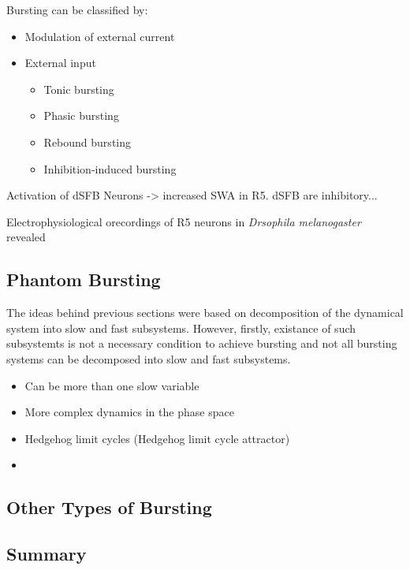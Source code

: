 \documentclass[../main.tex]{subfiles}
\begin{document}
\color{red}
Bursting can be classified by:
\begin{itemize}
    \item Modulation of external current
\end{itemize}    

\begin{itemize}
    \item External input
    \begin{itemize}
        \item Tonic bursting
        \item Phasic bursting
        \item Rebound bursting
        \item Inhibition-induced bursting
    \end{itemize}
\end{itemize}


Activation of dSFB Neurons -> increased SWA in R5. dSFB are inhibitory...
\color{black}

Electrophysiological orecordings of R5 neurons in \textit{Drsophila melanogaster}
revealed

\subsection{Phantom Bursting}

The ideas behind previous sections were based on decomposition of the
dynamical system into slow and fast subsystems. However, firstly, existance
of such subsystemts is not a necessary condition to achieve bursting and
not all bursting systems can be decomposed into slow and fast subsystems.

\color{red}

\begin{itemize}
    \item Can be more than one slow variable
    \item More complex dynamics in the phase space
    \item Hedgehog limit cycles (Hedgehog limit cycle attractor)
    \item 
\end{itemize}

\color{black}

\subsection{Other Types of Bursting}

\subsection{Summary}
\end{document}

